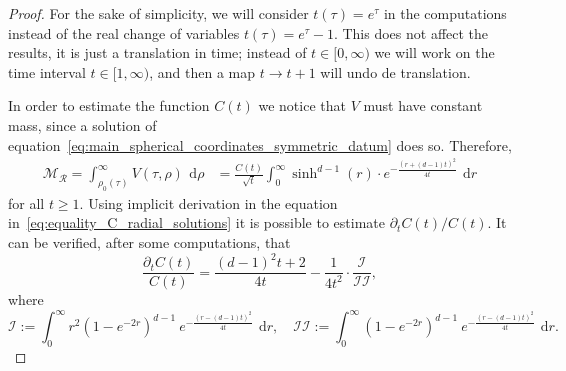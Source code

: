 \documentclass[10pt,a4paper]{amsart}
\def\d{\,\mathrm{d}}
\begin{document}
\begin{proof}
	For the sake of simplicity, we will consider $t(\tau)=e^\tau$ in the computations instead of the real change of variables $t(\tau)=e^\tau-1$. This does not affect the results, it is just a translation in time; instead of $t\in [0,\infty)$ we will work on the time interval $t\in[1, \infty)$, and then a map $t\to t+1$ will undo de translation.
	
	In order to estimate the function $C(t)$ we notice that $V$ must have constant mass, since a solution of equation~\eqref{eq:main_spherical_coordinates_symmetric_datum} does so. Therefore,
	\begin{equation}\label{eq:equality_C_radial_solutions}
		\begin{aligned}
			\mathcal{M}_{\mathcal{R}} = \int_{\rho_0(\tau)}^\infty V(\tau, \rho)\ \d \rho &= \frac{C(t)}{\sqrt{t}}\int_{0}^\infty \sinh^{d-1}(r)\cdot e^{- \frac{\left(r + (d-1)t\right)^2}{4t}}\ \d r
		\end{aligned}
	\end{equation}	
	for all $t\geq 1$. Using implicit derivation in the equation in~\eqref{eq:equality_C_radial_solutions} it is possible to estimate $\partial_t C(t)/C(t)$. It can be verified, after some computations, that
	\begin{equation}\label{eq:quotient_C(t)}
		\frac{\partial_t C(t)}{C(t)} = \frac{(d-1)^2t+2}{4t} - \frac{1}{4t^2}\cdot \frac{\mathcal{I}}{\mathcal{II}},
	\end{equation}
	where
	\[
	\mathcal{I}:= \int_0^\infty r^2 (1-e^{-2r})^{d-1}\ e^{- \frac{\left(r - (d-1)t\right)^2}{4t}}\ \d r,\quad  \mathcal{II}:= \int_0^\infty (1-e^{-2r})^{d-1}\ e^{- \frac{\left(r - (d-1)t\right)^2}{4t}}\ \d r.
	\]
	

\end{proof}
\end{document}

